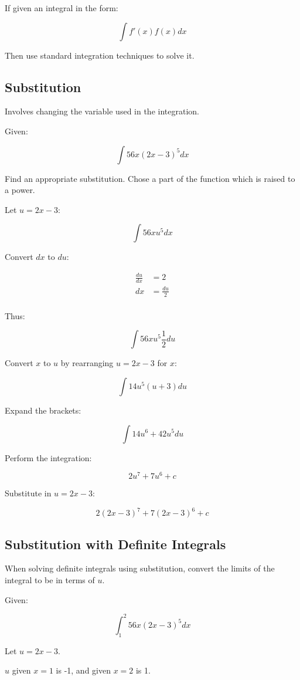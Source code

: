 \documentclass[a4paper,11pt]{report}
\begin{document}
If given an integral in the form:

$$
\int f'(x) f(x) dx
$$

Then use standard integration techniques to solve it.

\subsection{Substitution}

Involves changing the variable used in the integration.

Given:

$$
\int 56x(2x - 3)^5 dx
$$

Find an appropriate substitution. Chose a part of the function which is raised
to a power.

Let $u = 2x - 3$:

$$
\int 56xu^5 dx
$$

Convert $dx$ to $du$:

$$
\begin{aligned}
\frac{du}{dx} & = 2 \\
dx & = \frac{du}{2} \\
\end{aligned}
$$

Thus:

$$
\int 56xu^5 \frac{1}{2} du
$$

Convert $x$ to $u$ by rearranging $u = 2x - 3$ for $x$:

$$
\int 14u^5(u + 3) du
$$

Expand the brackets:

$$
\int 14u^6 + 42u^5 du
$$

Perform the integration:

$$
2u^7 + 7u^6 + c
$$

Substitute in $u = 2x - 3$:

$$
2(2x - 3)^7 + 7(2x - 3)^6 + c
$$

\subsection{Substitution with Definite Integrals}

When solving definite integrals using substitution, convert the limits of the
integral to be in terms of $u$.

Given:

$$
\int_1^2 56x(2x - 3)^5 dx
$$

Let $u = 2x - 3$.

$u$ given $x = 1$ is -1, and given $x = 2$ is 1.
\end{document}
